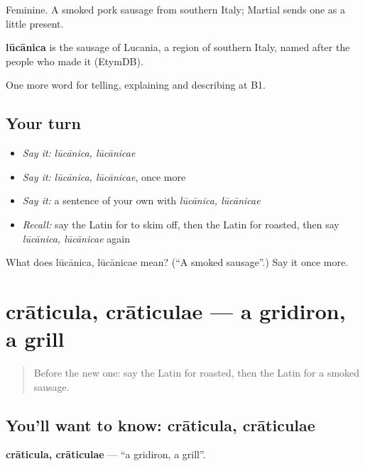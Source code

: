 Feminine. A smoked pork sausage from southern Italy; Martial sends one as a little present.

\begin{cousinweb}
\textbf{lūcānica} is the sausage of Lucania, a region of southern Italy, named after the people who made it (EtymDB).
\end{cousinweb}

\begin{grammarlens}[title={What you've built}]
One more word for telling, explaining and describing at B1.
\end{grammarlens}

\subsection*{Your turn}
\begin{itemize}
\raggedright
  \item \emph{Say it:} \emph{lūcānica, lūcānicae}
  \item \emph{Say it:} \emph{lūcānica, lūcānicae}, once more
  \item \emph{Say it:} a sentence of your own with \emph{lūcānica, lūcānicae}
  \item \emph{Recall:} say the Latin for to skim off, then the Latin for roasted, then say \emph{lūcānica, lūcānicae} again
\end{itemize}

\begin{tcolorbox}[breakable,colback=teal!4,colframe=teal!35!black,title={Before you move on}]
What does lūcānica, lūcānicae mean? (\textquotedblleft{}A smoked sausage\textquotedblright{}.) Say it once more.
\end{tcolorbox}
\section[crāticula, crāticulae]{crāticula, crāticulae — a gridiron, a grill}

\label{lesson:LA-C354-craticula}



\begin{quote}
Before the new one: say the Latin for roasted, then the Latin for a smoked sausage.
\end{quote}

\subsection*{You'll want to know: crāticula, crāticulae}
\textbf{crāticula, crāticulae} — \textquotedblleft{}a gridiron, a grill\textquotedblright{}.

